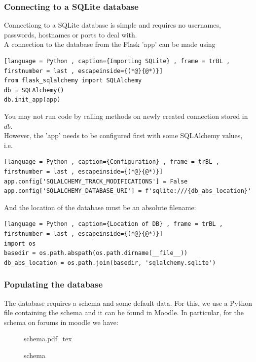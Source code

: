 \documentclass[a4paper]{article}
\newcommand{\incfig}[2][1]{%
    \def\svgwidth{#1\columnwidth}
    {#2.pdf_tex}
}
\theoremstyle{plain}
\theoremstyle{definition}
\theoremstyle{remark}
\begin{document}
\begin{flushleft}
\subsubsection{Connecting to a SQLite database}
Connectiong to a SQLite database is simple and requires no usernames, passwords, hostnames or ports to deal with. \\
A connection to the database from the Flask 'app' can be made using
\begin{lstlisting}[language = Python , caption={Importing SQLite} , frame = trBL , firstnumber = last , escapeinside={(*@}{@*)}]
from flask_sqlalchemy import SQLAlchemy
db = SQLAlchemy()
db.init_app(app)
\end{lstlisting}
You may not run code by calling methods on newly created connection stored in $db$. \\
However, the 'app' needs to be configured first with some SQLAlchemy values, i.e.
\begin{lstlisting}[language = Python , caption={Configuration} , frame = trBL , firstnumber = last , escapeinside={(*@}{@*)}]
app.config['SQLALCHEMY_TRACK_MODIFICATIONS'] = False
app.config['SQLALCHEMY_DATABASE_URI'] = f'sqlite:///{db_abs_location}'
\end{lstlisting}
And the location of the database must be an absolute filename:
\begin{lstlisting}[language = Python , caption={Location of DB} , frame = trBL , firstnumber = last , escapeinside={(*@}{@*)}]
import os
basedir = os.path.abspath(os.path.dirname(__file__))
db_abs_location = os.path.join(basedir, 'sqlalchemy.sqlite')
\end{lstlisting}
\subsubsection{Populating the database}
The database requires a schema and some default data. For this, we use a Python file containing the schema and it can be found in Moodle. In particular, for the schema on forums in moodle we have:
\begin{figure}[H]
    \centering
    \incfig{schema}
    \caption{schema}
    \label{fig:schema}
\end{figure}

\end{flushleft}
\end{document}
